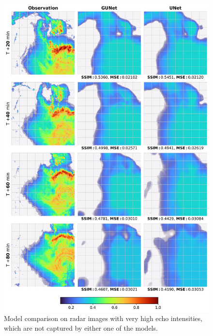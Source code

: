 \begin{figure}[ht]
    \centering
    \includegraphics[width=\textwidth]{images/comparison_square_01.png}
    \caption[Comparison of weather predictions of both models (2)]{\label{fig:comparison_01}Model comparison on radar images with very high echo intensities, which are not captured by either one of the models.}
\end{figure}

